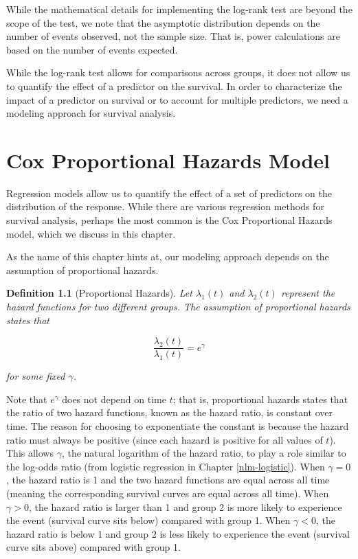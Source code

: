 \documentclass[
]{book}
\theoremstyle{plain}
\theoremstyle{mydefn}
\newtheorem{definition}{Definition}[chapter]
\theoremstyle{myexmpl}
\theoremstyle{remark}
\begin{document}
While the mathematical details for implementing the log-rank test are beyond the scope of the test, we note that the asymptotic distribution depends on the number of events observed, not the sample size. That is, power calculations are based on the number of events expected.

While the log-rank test allows for comparisons across groups, it does not allow us to quantify the effect of a predictor on the survival. In order to characterize the impact of a predictor on survival or to account for multiple predictors, we need a modeling approach for survival analysis.

\hypertarget{surv-cph}{%
\chapter{Cox Proportional Hazards Model}\label{surv-cph}}

Regression models allow us to quantify the effect of a set of predictors on the distribution of the response. While there are various regression methods for survival analysis, perhaps the most common is the Cox Proportional Hazards model, which we discuss in this chapter.

As the name of this chapter hints at, our modeling approach depends on the assumption of proportional hazards.

\begin{definition}[Proportional Hazards]
\protect\hypertarget{def:defn-proportion-hazards}{}{\label{def:defn-proportion-hazards} {} }Let \(\lambda_1(t)\) and \(\lambda_2(t)\) represent the hazard functions for two different groups. The assumption of proportional hazards states that

\[\frac{\lambda_2(t)}{\lambda_1(t)} = e^{\gamma}\]

for some fixed \(\gamma\).\\
\end{definition}

Note that \(e^{\gamma}\) does not depend on time \(t\); that is, proportional hazards states that the ratio of two hazard functions, known as the hazard ratio, is constant over time. The reason for choosing to exponentiate the constant is because the hazard ratio must always be positive (since each hazard is positive for all values of \(t\)). This allows \(\gamma\), the natural logarithm of the hazard ratio, to play a role similar to the log-odds ratio (from logistic regression in Chapter \ref{nlm-logistic}). When \(\gamma = 0\), the hazard ratio is 1 and the two hazard functions are equal across all time (meaning the corresponding survival curves are equal across all time). When \(\gamma > 0\), the hazard ratio is larger than 1 and group 2 is more likely to experience the event (survival curve sits below) compared with group 1. When \(\gamma < 0\), the hazard ratio is below 1 and group 2 is less likely to experience the event (survival curve sits above) compared with group 1.
\end{document}
